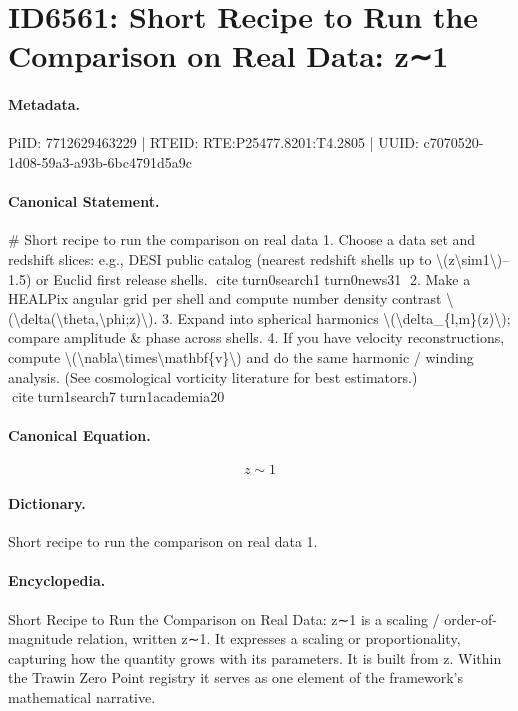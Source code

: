 \section*{ID6561: Short Recipe to Run the Comparison on Real Data: z∼1}
\paragraph{Metadata.}
PiID: 7712629463229 | RTEID: RTE:P25477.8201:T4.2805 | UUID: c7070520-1d08-59a3-a93b-6bc4791d5a9c

\paragraph{Canonical Statement.}
\# Short recipe to run the comparison on real data 1. Choose a data set and redshift slices: e.g., DESI public catalog (nearest redshift shells up to \textbackslash{}(z\textbackslash{}sim1\textbackslash{})–1.5) or Euclid first release shells. citeturn0search1turn0news31 2. Make a HEALPix angular grid per shell and compute number density contrast \textbackslash{}(\textbackslash{}delta(\textbackslash{}theta,\textbackslash{}phi;z)\textbackslash{}). 3. Expand into spherical harmonics \textbackslash{}(\textbackslash{}delta\_\{l,m\}(z)\textbackslash{}); compare amplitude \& phase across shells. 4. If you have velocity reconstructions, compute \textbackslash{}(\textbackslash{}nabla\textbackslash{}times\textbackslash{}mathbf\{v\}\textbackslash{}) and do the same harmonic / winding analysis. (See cosmological vorticity literature for best estimators.) citeturn1search7turn1academia20

\paragraph{Canonical Equation.}
\[
z\sim1
\]

\paragraph{Dictionary.}
Short recipe to run the comparison on real data 1.

\paragraph{Encyclopedia.}
Short Recipe to Run the Comparison on Real Data: z∼1 is a scaling / order-of-magnitude relation, written z∼1. It expresses a scaling or proportionality, capturing how the quantity grows with its parameters. It is built from z. Within the Trawin Zero Point registry it serves as one element of the framework's mathematical narrative.
